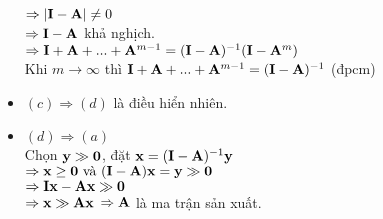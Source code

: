 \documentclass[12pt]{article}
\begin{document}
\begin{itemize}
                        $\Rightarrow |{\bf I - A}| \neq 0$\\
                        $\Rightarrow {\bf I - A}$ khả nghịch.\\
                        $\Rightarrow {\bf I + A} + ... + {\bf A}^{m-1} = ({\bf I - A})^{-1}({\bf I} - {\bf A}^m)$\\
                        Khi $m \to \infty$ thì ${\bf I + A} + ... + {\bf A}^{m-1} = ({\bf I - A})^{-1}$  (đpcm)
                    \item $(c) \Rightarrow (d)$ là điều hiển nhiên.
                    \item $(d) \Rightarrow (a)$\\
                        Chọn ${\bf y} \gg {\bf 0}$, đặt ${\bf x} = ({\bf I - A})^{-1}{\bf y}$\\
                        $\Rightarrow {\bf x} \geq {\bf 0} \text{ và } ({\bf I - A}){\bf x} = {\bf y} \gg {\bf 0}$\\
                        $\Rightarrow {\bf I}{\bf x} - {\bf A}{\bf x} \gg {\bf 0}$\\
                        $\Rightarrow {\bf x} \gg {\bf A}{\bf x}$
                        $\Rightarrow {\bf A}$ là ma trận sản xuất.             
                \end{itemize}
\end{document}
